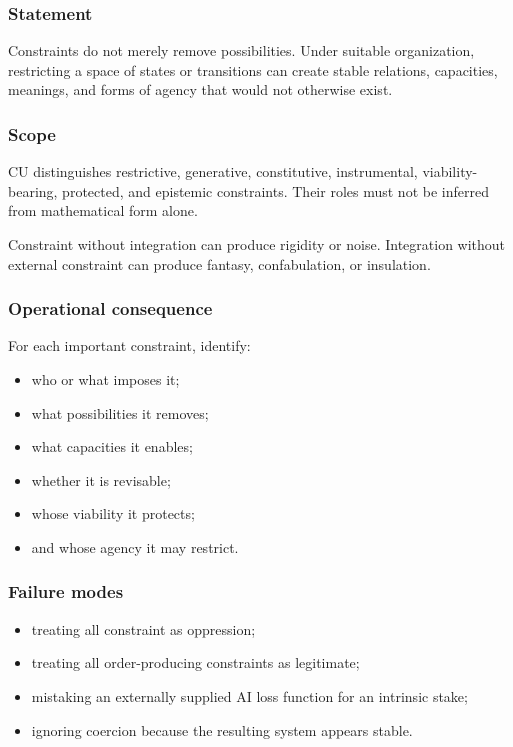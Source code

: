 \documentclass[
  11pt,
]{article}
\providecommand{\tightlist}{%
  \setlength{\itemsep}{0pt}\setlength{\parskip}{0pt}}
\begin{document}
\subsubsection{Statement}\label{statement-2}

Constraints do not merely remove possibilities. Under suitable
organization, restricting a space of states or transitions can create
stable relations, capacities, meanings, and forms of agency that would
not otherwise exist.

\subsubsection{Scope}\label{scope-2}

CU distinguishes restrictive, generative, constitutive, instrumental,
viability-bearing, protected, and epistemic constraints. Their roles
must not be inferred from mathematical form alone.

Constraint without integration can produce rigidity or noise.
Integration without external constraint can produce fantasy,
confabulation, or insulation.

\subsubsection{Operational consequence}\label{operational-consequence-2}

For each important constraint, identify:

\begin{itemize}
\tightlist
\item
  who or what imposes it;
\item
  what possibilities it removes;
\item
  what capacities it enables;
\item
  whether it is revisable;
\item
  whose viability it protects;
\item
  and whose agency it may restrict.
\end{itemize}

\subsubsection{Failure modes}\label{failure-modes-2}

\begin{itemize}
\tightlist
\item
  treating all constraint as oppression;
\item
  treating all order-producing constraints as legitimate;
\item
  mistaking an externally supplied AI loss function for an intrinsic
  stake;
\item
  ignoring coercion because the resulting system appears stable.
\end{itemize}
\end{document}
